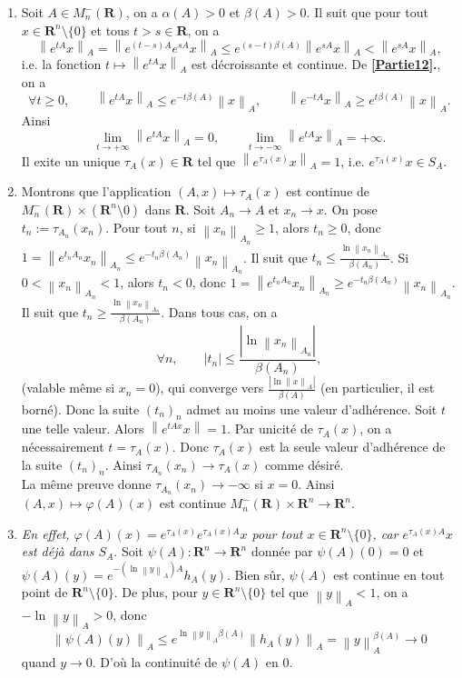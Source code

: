 \documentclass[french, 12pt]{article}
\theoremstyle{definition}
\newcommand{\abs}[1]{\left|#1\right|}
\newcommand{\norm}[1]{\left\|#1\right\|}
\newcommand{\Rbb}{\mathbf{R}}
\begin{document}
\begin{enumerate}
    
    \item  \label{Partie13} Soit $A \in M_n^{-}(\Rbb)$, on a $\alpha(A) > 0$ et $\beta(A) > 0$. Il suit que pour tout $x \in \Rbb^{n} \setminus \{0\}$ et tous $t > s \in \Rbb$, on a
        $$\norm{e^{tA}x}_A = \norm{e^{(t-s)A}e^{sA}x}_A \le e^{(s-t)\beta(A)}\norm{e^{sA}x}_A < \norm{e^{sA}x}_A,$$
    i.e. la fonction $t \mapsto \norm{e^{tA}x}_A$ est d\'ecroissante et continue. De {\bf \ref{Partie12}.}, on a
        $$\forall t \ge  0, \qquad \norm{e^{tA}x}_A \le e^{-t\beta(A)}\norm{x}_A, \qquad \norm{e^{-tA}x}_A \ge e^{t\beta(A)}\norm{x}_A.$$
    Ainsi
        $$\lim_{t \to + \infty} \norm{e^{tA}x}_A = 0, \qquad \lim_{t \to -\infty} \norm{e^{tA}x}_A = +\infty.$$
    Il exite un unique $\tau_A(x) \in \Rbb$ tel que $\norm{e^{\tau_A(x)}x}_A = 1$, i.e. $e^{\tau_A(x)}x \in S_A$.
    
    \item \label{Partie14} Montrons que l'application $(A,x) \mapsto \tau_A(x)$ est continue de $M_n^-(\Rbb) \times (\Rbb^n \setminus 0)$ dans $\Rbb$. Soit $A_n \to A$ et $x_n \to x$. On pose $t_n:=\tau_{A_n}(x_n)$. Pour tout $n$, si $\norm{x_n}_{A_n} \ge 1$, alors $t_n \ge 0$, donc $1 = \norm{e^{t_nA_n}x_n}_{A_n} \le e^{-t_n\beta(A_n)}\norm{x_n}_{A_n}$. Il suit que $t_n \le \frac{\ln \norm{x_n}_{A_n}}{\beta(A_n)}$. Si $0 < \norm{x_n}_{A_n} < 1$, alors $t_n < 0$, donc $1 = \norm{e^{t_n A_n}x_n}_{A_n} \ge e^{-t_n\beta(A_n)}\norm{x_n}_{A_n}$. Il suit que $t_n \ge \frac{\ln\norm{x_n}_{A_n}}{\beta(A_n)}$. Dans tous cas, on a
        $$\forall n, \qquad |t_n| \le \frac{\abs{\ln\norm{x_n}_{A_n}}}{\beta(A_n)},$$
    (valable m\^eme si $x_n = 0$), qui converge vers $\frac{\abs{\ln\norm{x}_A}}{\beta(A)}$ (en particulier, il est born\'e). Donc la suite $(t_n)_n$ admet au moins une valeur d'adh\'erence. Soit $t$ une telle valeur. Alors $\norm{e^{tAx}x} = 1$. Par unicit\'e de $\tau_A(x)$, on a n\'ecessairement $t = \tau_A(x)$. Donc $\tau_A(x)$ est la seule valeur d'adh\'erence de la suite $(t_n)_n$. Ainsi $\tau_{A_n}(x_n) \to \tau_A(x)$ comme d\'esir\'e. \\
    La m\^eme preuve donne $\tau_{A_n}(x_n) \to -\infty$ si $x = 0$. Ainsi $(A,x) \mapsto \varphi(A)(x)$ est continue $M_n^{-}(\Rbb) \times \Rbb^n \to \Rbb^n$.
    
    
    \item \label{Partie15} {\it En effet, $ \varphi(A)(x) = e^{\tau_A(x)}e^{\tau_A(x)A}x$ pour tout $x \in \Rbb^{n} \setminus \{0\}$, car $e^{\tau_A(x)A}x$ est d\'ej\`a dans $S_A$}. 
    Soit $\psi(A): \Rbb^n \to \Rbb^n$ donn\'ee par $\psi(A)(0) = 0$ et $\psi(A)(y) = e^{-(\ln\norm{y}_A) A}h_A(y)$. Bien s\^ur, $\psi(A)$ est continue en tout point de $\Rbb^n \setminus \{0\}$. De plus, pour $y \in \Rbb^n \setminus \{0\}$ tel que $\norm{y}_A < 1$, on a $-\ln\norm{y}_A > 0$, donc
        $$\norm{\psi(A)(y)}_A \le  e^{\ln\norm{y}_A\beta(A)}\norm{h_A(y)}_A = \norm{y}_A^{\beta(A)} \to 0$$
    quand $y \to 0$. D'o\`u la continuit\'e de $\psi(A)$ en $0$. 
    

\end{enumerate}
\end{document}
